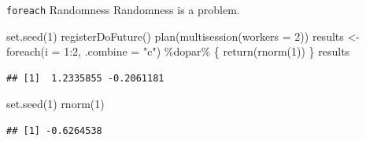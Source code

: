 \documentclass[
  ignorenonframetext,
  usenames,
  dvipsnames]{beamer}
\newenvironment{Shaded}{\begin{snugshade}}{\end{snugshade}}
\newcommand{\AttributeTok}[1]{\textcolor[rgb]{0.77,0.63,0.00}{#1}}
\newcommand{\DecValTok}[1]{\textcolor[rgb]{0.00,0.00,0.81}{#1}}
\newcommand{\FunctionTok}[1]{\textcolor[rgb]{0.00,0.00,0.00}{#1}}
\newcommand{\NormalTok}[1]{#1}
\newcommand{\OtherTok}[1]{\textcolor[rgb]{0.56,0.35,0.01}{#1}}
\newcommand{\SpecialCharTok}[1]{\textcolor[rgb]{0.00,0.00,0.00}{#1}}
\newcommand{\StringTok}[1]{\textcolor[rgb]{0.31,0.60,0.02}{#1}}
\begin{document}
\begin{frame}[fragile]{\texttt{foreach} Randomness}
\protect\hypertarget{foreach-randomness}{}
Randomness is a problem.

\begin{Shaded}
\begin{Highlighting}[]
\FunctionTok{set.seed}\NormalTok{(}\DecValTok{1}\NormalTok{)}
\FunctionTok{registerDoFuture}\NormalTok{()}
\FunctionTok{plan}\NormalTok{(}\FunctionTok{multisession}\NormalTok{(}\AttributeTok{workers =} \DecValTok{2}\NormalTok{))}
\NormalTok{results }\OtherTok{\textless{}{-}} \FunctionTok{foreach}\NormalTok{(}\AttributeTok{i =} \DecValTok{1}\SpecialCharTok{:}\DecValTok{2}\NormalTok{, }\AttributeTok{.combine =} \StringTok{"c"}\NormalTok{) }\SpecialCharTok{\%dopar\%}\NormalTok{ \{}
  \FunctionTok{return}\NormalTok{(}\FunctionTok{rnorm}\NormalTok{(}\DecValTok{1}\NormalTok{))}
\NormalTok{\}}
\NormalTok{results}
\end{Highlighting}
\end{Shaded}

\begin{verbatim}
## [1]  1.2335855 -0.2061181
\end{verbatim}

\begin{Shaded}
\begin{Highlighting}[]
\FunctionTok{set.seed}\NormalTok{(}\DecValTok{1}\NormalTok{)}
\FunctionTok{rnorm}\NormalTok{(}\DecValTok{1}\NormalTok{)}
\end{Highlighting}
\end{Shaded}

\begin{verbatim}
## [1] -0.6264538
\end{verbatim}
\end{frame}
\end{document}

